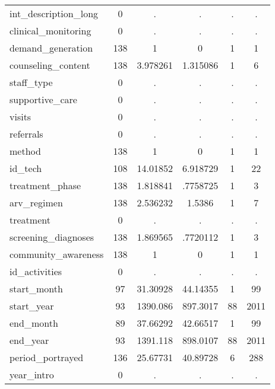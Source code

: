 \begin{table}[htbp]
\begin{tabular}{l*{1}{ccccc}}
int\_description\_long&           0&           .&           .&           .&           .\\
clinical\_monitoring&           0&           .&           .&           .&           .\\
demand\_generation&         138&           1&           0&           1&           1\\
counseling\_content&         138&    3.978261&    1.315086&           1&           6\\
staff\_type  &           0&           .&           .&           .&           .\\
supportive\_care&           0&           .&           .&           .&           .\\
visits      &           0&           .&           .&           .&           .\\
referrals   &           0&           .&           .&           .&           .\\
method      &         138&           1&           0&           1&           1\\
id\_tech     &         108&    14.01852&    6.918729&           1&          22\\
treatment\_phase&         138&    1.818841&    .7758725&           1&           3\\
arv\_regimen &         138&    2.536232&      1.5386&           1&           7\\
treatment   &           0&           .&           .&           .&           .\\
screening\_diagnoses&         138&    1.869565&    .7720112&           1&           3\\
community\_awareness&         138&           1&           0&           1&           1\\
id\_activities&           0&           .&           .&           .&           .\\
start\_month &          97&    31.30928&    44.14355&           1&          99\\
start\_year  &          93&    1390.086&    897.3017&          88&        2011\\
end\_month   &          89&    37.66292&    42.66517&           1&          99\\
end\_year    &          93&    1391.118&    898.0107&          88&        2011\\
period\_portrayed&         136&    25.67731&    40.89728&           6&         288\\
year\_intro  &           0&           .&           .&           .&           .\\

\end{tabular}
\end{table}

